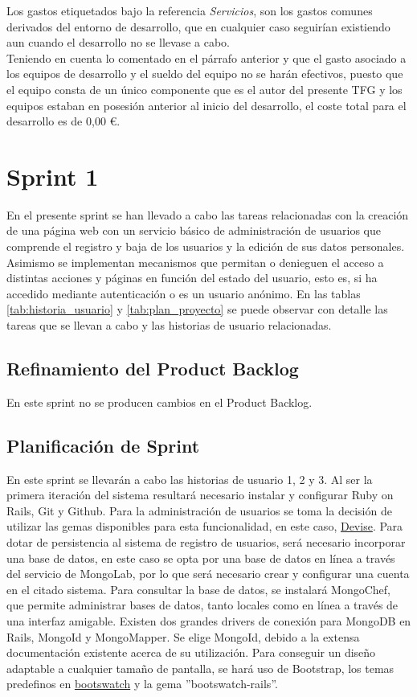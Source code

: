 Los gastos etiquetados bajo la referencia \textit{Servicios}, son los gastos comunes derivados del entorno de desarrollo, que en cualquier caso seguirían existiendo aun cuando el desarrollo no se llevase a cabo.
\\Teniendo en cuenta lo comentado en el párrafo anterior y que el gasto asociado a los equipos de desarrollo y el sueldo del equipo no se harán efectivos, puesto que el equipo consta de un único componente que es el autor del presente \ac{TFG} y los equipos estaban en posesión anterior al inicio del desarrollo, el coste total para el desarrollo es de 0,00 \euro.


\section{Sprint 1}
En el presente sprint se han llevado a cabo las tareas relacionadas con la creación de una página web con un servicio básico de administración de usuarios que comprende el registro y baja de los usuarios y la edición de sus datos personales. Asimismo se implementan mecanismos que permitan o denieguen el acceso a distintas acciones y páginas en función del estado del usuario, esto es, si ha accedido mediante autenticación o es un usuario anónimo. En las tablas \ref{tab:historia_usuario} y \ref{tab:plan_proyecto} se puede observar con detalle las tareas que se llevan a cabo y las historias de usuario relacionadas.

	\subsection{Refinamiento del Product Backlog}
	En este sprint no se producen cambios en el Product Backlog.
	
	\subsection{Planificación de Sprint}
	En este sprint se llevarán a cabo las historias de usuario 1, 2 y 3. Al ser la primera iteración del sistema resultará necesario instalar y configurar Ruby on Rails, Git y Github. Para la administración de usuarios se toma la decisión de utilizar las gemas disponibles para esta funcionalidad, en este caso, \href{https://github.com/plataformatec/devise}{Devise}. Para dotar de persistencia al sistema de registro de usuarios, será necesario incorporar una base de datos, en este caso se opta por una base de datos en línea a través del servicio de MongoLab, por lo que será necesario crear y configurar una cuenta en el citado sistema. Para consultar la base de datos, se instalará MongoChef, que permite administrar bases de datos, tanto locales como en línea a través de una interfaz amigable. Existen dos grandes drivers de conexión para MongoDB en Rails, MongoId y MongoMapper. Se elige MongoId, debido a la extensa documentación existente acerca de su utilización. Para conseguir un diseño adaptable a cualquier tamaño de pantalla, se hará uso de Bootstrap, los temas predefinos en \href{https://bootswatch.com/}{bootswatch} y la gema ''bootswatch-rails''.
	
